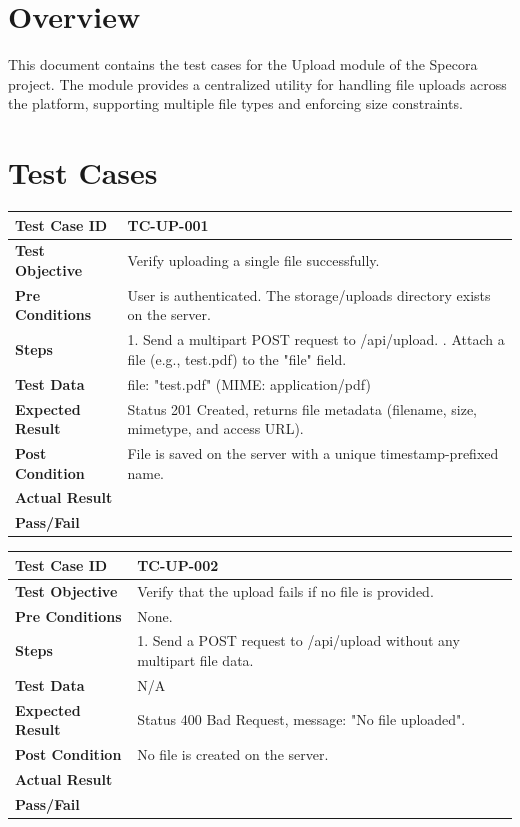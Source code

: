 \section{Overview}
This document contains the test cases for the Upload module of the Specora project. The module provides a centralized utility for handling file uploads across the platform, supporting multiple file types and enforcing size constraints.

\section{Test Cases}

\begin{longtable}{|p{}|p{}|}
\hline
\textbf{Test Case ID} & TC-UP-001 \\ \hline
\textbf{Test Objective} & Verify uploading a single file successfully. \\ \hline
\textbf{Pre Conditions} & User is authenticated. The storage/uploads directory exists on the server. \\ \hline
\textbf{Steps} & 
1. Send a multipart POST request to /api/upload. \newline
2. Attach a file (e.g., test.pdf) to the "file" field. \\ \hline
\textbf{Test Data} & file: "test.pdf" (MIME: application/pdf) \\ \hline
\textbf{Expected Result} & Status 201 Created, returns file metadata (filename, size, mimetype, and access URL). \\ \hline
\textbf{Post Condition} & File is saved on the server with a unique timestamp-prefixed name. \\ \hline
\textbf{Actual Result} &  \\ \hline
\textbf{Pass/Fail} &  \\ \hline
\end{longtable}

\begin{longtable}{|p{}|p{}|}
\hline
\textbf{Test Case ID} & TC-UP-002 \\ \hline
\textbf{Test Objective} & Verify that the upload fails if no file is provided. \\ \hline
\textbf{Pre Conditions} & None. \\ \hline
\textbf{Steps} & 
1. Send a POST request to /api/upload without any multipart file data. \\ \hline
\textbf{Test Data} & N/A \\ \hline
\textbf{Expected Result} & Status 400 Bad Request, message: "No file uploaded". \\ \hline
\textbf{Post Condition} & No file is created on the server. \\ \hline
\textbf{Actual Result} &  \\ \hline
\textbf{Pass/Fail} &  \\ \hline
\end{longtable}

